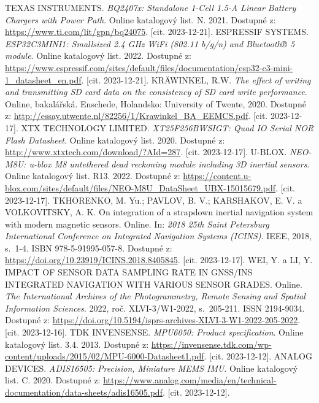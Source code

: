 \begin{thebibliography}{22}
TEXAS INSTRUMENTS. \textit{BQ2407x: Standalone 1-Cell 1.5-A Linear Battery Chargers with Power Path}. Online katalogový list. N. 2021. Dostupné z: \url{https://www.ti.com/lit/gpn/bq24075}. [cit. 2023-12-21].
ESPRESSIF SYSTEMS. \textit{ESP32C3MINI1: Smallsized 2.4 GHz WiFi (802.11 b/g/n) and Bluetooth® 5 module}. Online katalogový list. 2022. Dostupné z: \url{https://www.espressif.com/sites/default/files/documentation/esp32-c3-mini-1\_datasheet\_en.pdf}. [cit. 2023-12-21].
KRÄWINKEL, R.W. \textit{The effect of writing and transmitting SD card data on the consistency of SD card write performance}. Online, bakalářská. Enschede, Holandsko: University of Twente, 2020. Dostupné z: \url{http://essay.utwente.nl/82256/1/Krawinkel\_BA\_EEMCS.pdf}. [cit. 2023-12-17].
XTX TECHNOLOGY LIMITED. \textit{XT25F256BWSIGT: Quad IO Serial NOR Flash Datasheet}. Online katalogový list. 2020. Dostupné z: \url{http://www.xtxtech.com/download/?AId=287}. [cit. 2023-12-17].
U-BLOX. \textit{NEO-M8U: u-blox M8 untethered dead reckoning module including 3D inertial sensors}. Online katalogový list. R13. 2022. Dostupné z: \url{https://content.u-blox.com/sites/default/files/NEO-M8U\_DataSheet\_UBX-15015679.pdf}. [cit. 2023-12-17].
TKHORENKO, M. Yu.; PAVLOV, B. V.; KARSHAKOV, E. V. a VOLKOVITSKY, A. K. On integration of a strapdown inertial navigation system with modern magnetic sensors. Online. In: \textit{2018 25th Saint Petersburg International Conference on Integrated Navigation Systems (ICINS)}. IEEE, 2018, s.~1-4. ISBN 978-5-91995-057-8. Dostupné z: \url{https://doi.org/10.23919/ICINS.2018.8405845}. [cit. 2023-12-17].
WEI, Y. a LI, Y. IMPACT OF SENSOR DATA SAMPLING RATE IN GNSS/INS INTEGRATED NAVIGATION WITH VARIOUS SENSOR GRADES. Online. \textit{The International Archives of the Photogrammetry, Remote Sensing and Spatial Information Sciences}. 2022, roč. XLVI-3/W1-2022, s.~205-211. ISSN 2194-9034. Dostupné z: \url{https://doi.org/10.5194/isprs-archives-XLVI-3-W1-2022-205-2022}. [cit. 2023-12-16].
TDK INVENSENSE. \textit{MPU6050: Product specification}. Online katalogový list. 3.4. 2013. Dostupné z: \url{https://invensense.tdk.com/wp-content/uploads/2015/02/MPU-6000-Datasheet1.pdf}. [cit. 2023-12-12].
ANALOG DEVICES. \textit{ADIS16505: Precision, Miniature MEMS IMU}. Online katalogový list. C. 2020. Dostupné z: \url{https://www.analog.com/media/en/technical-documentation/data-sheets/adis16505.pdf}. [cit. 2023-12-12].

\end{thebibliography}
